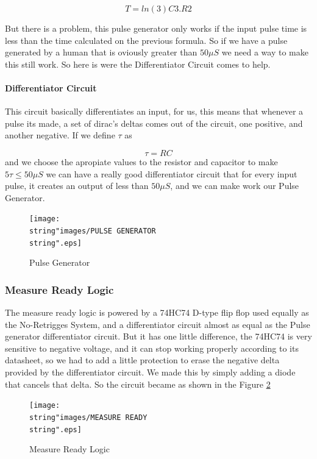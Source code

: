 \[
T=ln(3)C3.R2
\]

But there is a problem, this pulse generator only works if the input
pulse time is less than the time calculated on the previous formula.
So if we have a pulse generated by a human that is oviously greater
than $50\mu S$ we need a way to make this still work. So here is
were the Differentiator Circuit comes to help.

\paragraph{Differentiator Circuit}

This circuit basically differentiates an input, for us, this means
that whenever a pulse its made, a set of dirac's deltas comes out
of the circuit, one positive, and another negative. If we define $\tau$
as 

\[
\tau=RC
\]
 and we choose the apropiate values to the resistor and capacitor
to make $5\tau\leq50\mu S$ we can have a really good differentiator
circuit that for every input pulse, it creates an output of less than
$50\mu S$, and we can make work our Pulse Generator.

\begin{figure}[H]
\begin{centering}
\texttt{[image: \\string"images/PULSE GENERATOR\\string".eps]}
\par\end{centering}
\caption{Pulse Generator}
\label{8_5}
\end{figure}

\subsubsection{Measure Ready Logic}

The measure ready logic is powered by a 74HC74 D-type flip flop used
equally as the No-Retrigges System, and a differentiator circuit almost
as equal as the Pulse generator differentiator circuit. But it has
one little difference, the 74HC74 is very sensitive to negative voltage,
and it can stop working properly according to its datasheet, so we
had to add a little protection to erase the negative delta provided
by the differentiator circuit. We made this by simply adding a diode
that cancels that delta. So the circuit became as shown in the Figure
\ref{8_6}

\begin{figure}[H]
\begin{centering}
\texttt{[image: \\string"images/MEASURE READY\\string".eps]}
\par\end{centering}
\caption{Measure Ready Logic}

\label{8_6}
\end{figure}

